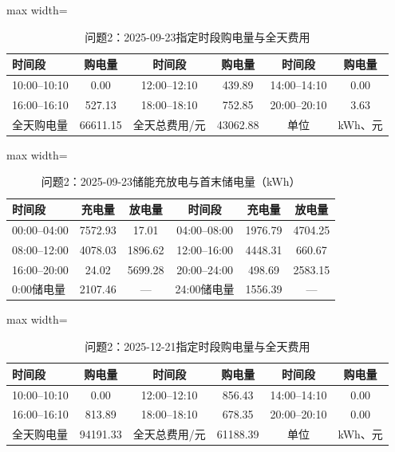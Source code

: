 \documentclass[UTF8,a4paper,zihao=-4,fontset=windows]{ctexart}
\begin{document}
\begin{table}[H]\centering\caption{问题2：2025-09-23指定时段购电量与全天费用}
\fontsize{9.5}{12}\selectfont\setlength{\tabcolsep}{4pt}\renewcommand{\arraystretch}{1.12}
\begin{adjustbox}{max width=\linewidth}\begin{tabular}{lccccc}\toprule
时间段 & 购电量 & 时间段 & 购电量 & 时间段 & 购电量\\\midrule
10:00–10:10 & 0.00 & 12:00–12:10 & 439.89 & 14:00–14:10 & 0.00\\
16:00–16:10 & 527.13 & 18:00–18:10 & 752.85 & 20:00–20:10 & 3.63\\
全天购电量 & 66611.15 & 全天总费用/元 & 43062.88 & 单位 & kWh、元\\
\bottomrule\end{tabular}\end{adjustbox}\end{table}
\begin{table}[H]\centering\caption{问题2：2025-09-23储能充放电与首末储电量（kWh）}
\fontsize{9.5}{12}\selectfont\setlength{\tabcolsep}{4pt}\renewcommand{\arraystretch}{1.12}
\begin{adjustbox}{max width=\linewidth}\begin{tabular}{lccccc}\toprule
时间段 & 充电量 & 放电量 & 时间段 & 充电量 & 放电量\\\midrule
00:00–04:00 & 7572.93 & 17.01 & 04:00–08:00 & 1976.79 & 4704.25\\
08:00–12:00 & 4078.03 & 1896.62 & 12:00–16:00 & 4448.31 & 660.67\\
16:00–20:00 & 24.02 & 5699.28 & 20:00–24:00 & 498.69 & 2583.15\\
0:00储电量 & 2107.46 & — & 24:00储电量 & 1556.39 & —\\
\bottomrule\end{tabular}\end{adjustbox}\end{table}
\begin{table}[H]\centering\caption{问题2：2025-12-21指定时段购电量与全天费用}
\fontsize{9.5}{12}\selectfont\setlength{\tabcolsep}{4pt}\renewcommand{\arraystretch}{1.12}
\begin{adjustbox}{max width=\linewidth}\begin{tabular}{lccccc}\toprule
时间段 & 购电量 & 时间段 & 购电量 & 时间段 & 购电量\\\midrule
10:00–10:10 & 0.00 & 12:00–12:10 & 856.43 & 14:00–14:10 & 0.00\\
16:00–16:10 & 813.89 & 18:00–18:10 & 678.35 & 20:00–20:10 & 0.00\\
全天购电量 & 94191.33 & 全天总费用/元 & 61188.39 & 单位 & kWh、元\\
\bottomrule\end{tabular}\end{adjustbox}\end{table}
\end{document}
